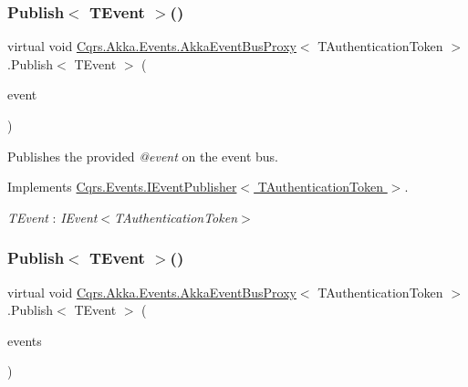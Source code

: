 \subsubsection{\texorpdfstring{Publish$<$ T\+Event $>$()}{Publish< TEvent >()}\hspace{0.1cm}{\footnotesize\ttfamily [1/2]}}
{\footnotesize\ttfamily virtual void \hyperlink{classCqrs_1_1Akka_1_1Events_1_1AkkaEventBusProxy}{Cqrs.\+Akka.\+Events.\+Akka\+Event\+Bus\+Proxy}$<$ T\+Authentication\+Token $>$.Publish$<$ T\+Event $>$ (\begin{DoxyParamCaption}\item[{T\+Event @}]{event }\end{DoxyParamCaption})\hspace{0.3cm}{\ttfamily [virtual]}}



Publishes the provided {\itshape @event}  on the event bus. 



Implements \hyperlink{interfaceCqrs_1_1Events_1_1IEventPublisher_a02f0db0bc9b3aa1c7f766f58f8422ee3_a02f0db0bc9b3aa1c7f766f58f8422ee3}{Cqrs.\+Events.\+I\+Event\+Publisher$<$ T\+Authentication\+Token $>$}.

\begin{Desc}
\item[Type Constraints]\begin{description}
\item[{\em T\+Event} : {\em I\+Event$<$T\+Authentication\+Token$>$}]\end{description}
\end{Desc}
\mbox{\label{classCqrs_1_1Akka_1_1Events_1_1AkkaEventBusProxy_af4c202eaab00ed2fb6160d5b114d935c_af4c202eaab00ed2fb6160d5b114d935c}} 
\subsubsection{\texorpdfstring{Publish$<$ T\+Event $>$()}{Publish< TEvent >()}\hspace{0.1cm}{\footnotesize\ttfamily [2/2]}}
{\footnotesize\ttfamily virtual void \hyperlink{classCqrs_1_1Akka_1_1Events_1_1AkkaEventBusProxy}{Cqrs.\+Akka.\+Events.\+Akka\+Event\+Bus\+Proxy}$<$ T\+Authentication\+Token $>$.Publish$<$ T\+Event $>$ (\begin{DoxyParamCaption}\item[{I\+Enumerable$<$ T\+Event $>$}]{events }\end{DoxyParamCaption})\hspace{0.3cm}{\ttfamily [virtual]}}



